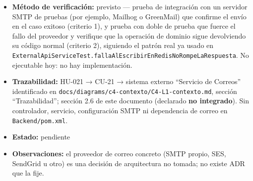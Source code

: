 \documentclass[
  spanish,
]{article}
\providecommand{\tightlist}{%
  \setlength{\itemsep}{0pt}\setlength{\parskip}{0pt}}
\begin{document}
\begin{itemize}
  \begin{enumerate}
  \def\labelenumi{\arabic{enumi}.}
  \tightlist
  \item
    Dado un registro de usuario exitoso y un servicio de correo
    disponible, cuando se completa el registro, entonces se envía un
    correo de bienvenida a la dirección registrada.
  \item
    Dado que el servicio de correo externo no está disponible, cuando
    ocurre un evento notificable, entonces la operación de dominio que
    lo originó (por ejemplo, el registro) completa exitosamente con su
    código HTTP normal, y el fallo de envío queda registrado en el log
    del sistema sin propagarse como error al cliente.
  \item
    El envío es asíncrono: el tiempo de respuesta de la operación de
    dominio no depende del tiempo de respuesta del servicio de correo.
  \item
    El cuerpo del correo no incluye contraseñas, hashes ni tokens.
  \end{enumerate}
\item
  \textbf{Método de verificación:} previsto --- prueba de integración
  con un servidor SMTP de pruebas (por ejemplo, Mailhog o GreenMail) que
  confirme el envío en el caso exitoso (criterio 1), y prueba con doble
  de prueba que fuerce el fallo del proveedor y verifique que la
  operación de dominio sigue devolviendo su código normal (criterio 2),
  siguiendo el patrón real ya usado en
  \texttt{External\allowbreak{}Api\allowbreak{}Service\allowbreak{}Test.\allowbreak{}falla\allowbreak{}Al\allowbreak{}Escribir\allowbreak{}En\allowbreak{}Redis\allowbreak{}No\allowbreak{}Rompe\allowbreak{}La\allowbreak{}Respuesta}.
  No ejecutable hoy: no hay implementación.
\item
  \textbf{Trazabilidad:} HU-021 → CU-21 → sistema externo ``Servicio de
  Correos'' identificado en
  \texttt{docs/\allowbreak{}diagrams/\allowbreak{}c4-\allowbreak{}contexto/\allowbreak{}C4-\allowbreak{}L1-\allowbreak{}contexto.\allowbreak{}md}, sección
  ``Trazabilidad''; sección 2.6 de este documento (declarado \textbf{no
  integrado}). Sin controlador, servicio, configuración SMTP ni
  dependencia de correo en \texttt{Backend/\allowbreak{}pom.\allowbreak{}xml}.
\item
  \textbf{Estado:} pendiente
\item
  \textbf{Observaciones:} el proveedor de correo concreto (SMTP propio,
  SES, SendGrid u otro) es una decisión de arquitectura no tomada; no
  existe ADR que la fije.
\end{itemize}
\end{document}
